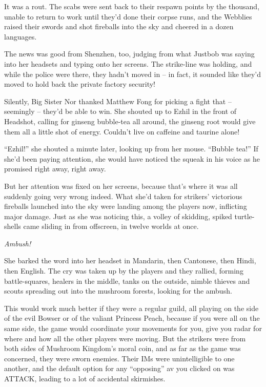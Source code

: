 It was a rout. The scabs were sent back to their respawn points by
the thousand, unable to return to work until they'd done their
corpse runs, and the Webblies raised their swords and shot
fireballs into the sky and cheered in a dozen languages.

The news was good from Shenzhen, too, judging from what Justbob was
saying into her headsets and typing onto her screens. The
strike-line was holding, and while the police were there, they
hadn't moved in -- in fact, it sounded like they'd moved to hold
back the private factory security!

Silently, Big Sister Nor thanked Matthew Fong for picking a fight
that -- seemingly -- they'd be able to win. She shouted up to Ezhil
in the front of Headshot, calling for ginseng bubble-tea all
around, the ginseng root would give them all a little shot of
energy. Couldn't live on caffeine and taurine alone!

``Ezhil!'' she shouted a minute later, looking up from her mouse.
``Bubble tea!'' If she'd been paying attention, she would have
noticed the squeak in his voice as he promised right away, right
away.

But her attention was fixed on her screens, because that's where it
was all suddenly going very wrong indeed. What she'd taken for
strikers' victorious fireballs launched into the sky were landing
among the players now, inflicting major damage. Just as she was
noticing this, a volley of skidding, spiked turtle-shells came
sliding in from offscreen, in twelve worlds at once.

\emph{Ambush!}

She barked the word into her headset in Mandarin, then Cantonese,
then Hindi, then English. The cry was taken up by the players and
they rallied, forming battle-squares, healers in the middle, tanks
on the outside, nimble thieves and scouts spreading out into the
mushroom forests, looking for the ambush.

This would work much better if they were a regular guild, all
playing on the side of the evil Bowser or of the valiant Princess
Peach, because if you were all on the same side, the game would
coordinate your movements for you, give you radar for where and how
all the other players were moving. But the strikers were from both
sides of Mushroom Kingdom's moral coin, and as far as the game was
concerned, they were sworn enemies. Their IMs were unintelligible
to one another, and the default option for any ``opposing'' av you
clicked on was ATTACK, leading to a lot of accidental skirmishes.

